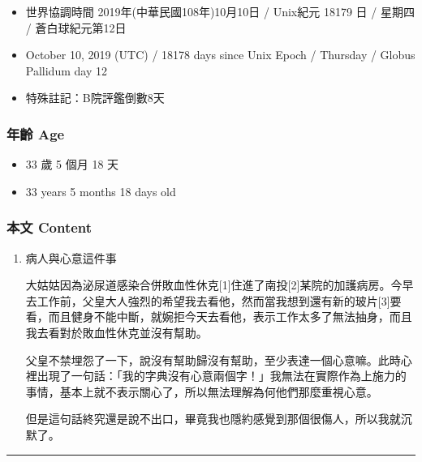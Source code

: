 \documentclass[
]{article}
\providecommand{\tightlist}{%
  \setlength{\itemsep}{0pt}\setlength{\parskip}{0pt}}
\begin{document}
\begin{itemize}
\tightlist
\item
  世界協調時間 2019年(中華民國108年)10月10日 / Unix紀元 18179 日 /
  星期四 / 蒼白球紀元第12日
\item
  October 10, 2019 (UTC) / 18178 days since Unix Epoch / Thursday /
  Globus Pallidum day 12
\item
  特殊註記：B院評鑑倒數8天
\end{itemize}

\hypertarget{ux5e74ux9f61-age-9}{%
\subsubsection{年齡 Age}\label{ux5e74ux9f61-age-9}}

\begin{itemize}
\tightlist
\item
  33 歲 5 個月 18 天
\item
  33 years 5 months 18 days old
\end{itemize}

\hypertarget{ux672cux6587-content-9}{%
\subsubsection{本文 Content}\label{ux672cux6587-content-9}}

\begin{enumerate}
\def\labelenumi{\arabic{enumi}.}
\item
  病人與心意這件事

  大姑姑因為泌尿道感染合併敗血性休克{[}1{]}住進了南投{[}2{]}某院的加護病房。今早去工作前，父皇大人強烈的希望我去看他，然而當我想到還有新的玻片{[}3{]}要看，而且健身不能中斷，就婉拒今天去看他，表示工作太多了無法抽身，而且我去看對於敗血性休克並沒有幫助。

  父皇不禁埋怨了一下，說沒有幫助歸沒有幫助，至少表達一個心意嘛。此時心裡出現了一句話：「我的字典沒有心意兩個字！」我無法在實際作為上施力的事情，基本上就不表示關心了，所以無法理解為何他們那麼重視心意。

  但是這句話終究還是說不出口，畢竟我也隱約感覺到那個很傷人，所以我就沉默了。
\end{enumerate}

\begin{center}\rule{0.5\linewidth}{\linethickness}\end{center}
\end{document}
